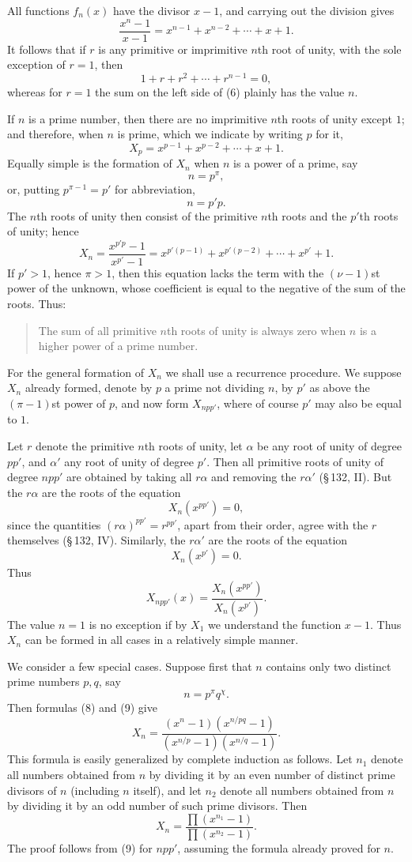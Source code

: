 \documentclass[11pt]{article}
\begin{document}
All functions $f_n(x)$ have the divisor $x-1$, and carrying out the division gives
\[
\tag{5}        \frac{x^n-1}{x-1}=x^{n-1}+x^{n-2}+\cdots+x+1.
\]
It follows that if $r$ is any primitive or imprimitive $n$th root of unity, with the sole exception of $r=1$, then
\[
\tag{6}        1+r+r^2+\cdots+r^{n-1}=0,
\]
whereas for $r=1$ the sum on the left side of (6) plainly has the value $n$.

If $n$ is a prime number, then there are no imprimitive $n$th roots of unity except $1$; and therefore, when $n$ is prime, which we indicate by writing $p$ for it,
\[
\tag{7}        X_p=x^{p-1}+x^{p-2}+\cdots+x+1.
\]
Equally simple is the formation of $X_n$ when $n$ is a power of a prime, say
\[
        n=p^\pi,
\]
or, putting $p^{\pi-1}=p'$ for abbreviation,
\[
        n=p'p.
\]
The $n$th roots of unity then consist of the primitive $n$th roots and the $p'$th roots of unity; hence
\[
\tag{8}        X_n=\frac{x^{p'p}-1}{x^{p'}-1}
=x^{p'(p-1)}+x^{p'(p-2)}+\cdots+x^{p'}+1.
\]
If $p'>1$, hence $\pi>1$, then this equation lacks the term with the $(\nu-1)$st power of the unknown, whose coefficient is equal to the negative of the sum of the roots. Thus:
\begin{quote}
The sum of all primitive $n$th roots of unity is always zero when $n$ is a higher power of a prime number.
\end{quote}

For the general formation of $X_n$ we shall use a recurrence procedure. We suppose $X_n$ already formed, denote by $p$ a prime not dividing $n$, by $p'$ as above the $(\pi-1)$st power of $p$, and now form $X_{npp'}$, where of course $p'$ may also be equal to $1$.

Let $r$ denote the primitive $n$th roots of unity, let $\alpha$ be any root of unity of degree $pp'$, and $\alpha'$ any root of unity of degree $p'$. Then all primitive roots of unity of degree $npp'$ are obtained by taking all $r\alpha$ and removing the $r\alpha'$ (\S\,132, II). But the $r\alpha$ are the roots of the equation
\[
        X_n(x^{pp'})=0,
\]
since the quantities $(r\alpha)^{pp'}=r^{pp'}$, apart from their order, agree with the $r$ themselves (\S\,132, IV). Similarly, the $r\alpha'$ are the roots of the equation
\[
        X_n(x^{p'})=0.
\]
Thus
\[
\tag{9}        X_{npp'}(x)=\frac{X_n(x^{pp'})}{X_n(x^{p'})}.
\]
The value $n=1$ is no exception if by $X_1$ we understand the function $x-1$. Thus $X_n$ can be formed in all cases in a relatively simple manner.

We consider a few special cases. Suppose first that $n$ contains only two distinct prime numbers $p,q$, say
\[
        n=p^\pi q^\chi.
\]
Then formulas (8) and (9) give
\[
        X_n=\frac{(x^n-1)(x^{n/pq}-1)}{(x^{n/p}-1)(x^{n/q}-1)}.
\]
This formula is easily generalized by complete induction as follows. Let $n_1$ denote all numbers obtained from $n$ by dividing it by an even number of distinct prime divisors of $n$ (including $n$ itself), and let $n_2$ denote all numbers obtained from $n$ by dividing it by an odd number of such prime divisors. Then
\[
\tag{10}       X_n=\frac{\prod(x^{n_1}-1)}{\prod(x^{n_2}-1)}.
\]
The proof follows from (9) for $npp'$, assuming the formula already proved for $n$.
\end{document}
